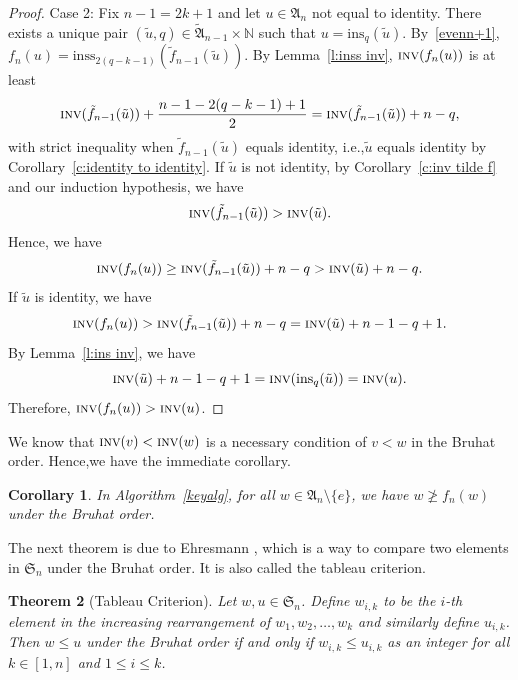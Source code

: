 \documentclass[12pt]{amsart}
\newtheorem{thm}{Theorem}[section]
\newtheorem{cor}[thm]{Corollary}
\theoremstyle{definition}
\numberwithin{equation}{section}
\newcommand{\sn}{\mathfrak{S}_n}
\newcommand{\inv}{\textsc{inv}}
\newcommand{\ins}[1]{\mathrm{ins}_{#1}}
\newcommand{\inss}[1]{\mathrm{inss}_{#1}}
\begin{document}
\begin{proof}
    Case 2: Fix $n-1 = 2k+1$ and let $u \in \mathfrak A_n$ not equal to identity. There exists a unique pair $(\tilde{u},q) \in \tilde{\mathfrak A}_{n-1} \times \mathbb N$ such that $u = \ins q (\tilde{u})$. By~\eqref{evenn+1}, $f_n(u) = \inss{2(q-k-1)}(\tilde{f}_{n-1}(\tilde{u}))$. By Lemma~\ref{l:inss inv}, $\inv (f_n(u))$ is at least
    \begin{equation*}
        \inv (\tilde{f}_{n-1}(\tilde{u}))+ \frac{n-1 - 2(q-k-1) +1}{2} = \inv (\tilde{f}_{n-1}(\tilde{u})) +n-q,
    \end{equation*}with strict inequality when $\tilde{f}_{n-1}(\tilde{u})$ equals identity, i.e.,$\tilde{u}$ equals identity by Corollary~\ref{c:identity to identity}. If $\tilde{u}$ is not identity, by Corollary~\ref{c:inv tilde f} and our induction hypothesis, we have
    \begin{equation*}
        \inv (\tilde{f}_{n-1} (\tilde{u})) > \inv (\tilde{u}).
    \end{equation*}Hence, we have \begin{equation*}
        \inv (f_n(u)) \geq \inv (\tilde{f}_{n-1}(\tilde{u})) +n-q > \inv (\tilde{u}) +n-q.
    \end{equation*}
    If $\tilde{u}$ is identity, we have
    \begin{equation*}
        \inv (f_n(u)) > \inv (\tilde{f}_{n-1}(\tilde{u})) +n-q = \inv (\tilde{u}) +n-1-q+1.
    \end{equation*}
    By Lemma~\ref{l:ins inv}, we have \begin{equation*}
         \inv (\tilde{u}) +n-1-q+1 = \inv (\ins q (\tilde{u})) = \inv (u).
    \end{equation*}Therefore, $\inv (f_n(u)) > \inv (u)$.
\end{proof}

We know that $\inv (v) < \inv (w)$ is a necessary condition of $v < w$ in the Bruhat order. Hence,we have the immediate corollary.

\begin{cor}
    In Algorithm~\ref{keyalg}, for all $w\in \mathfrak A_n \setminus\{e\}$, we have $w \ngeq f_n(w)$ under the Bruhat order.
\end{cor}

The next theorem is due to Ehresmann \cite{Ehresmann}, which is a way to compare two elements in $\sn$ under the Bruhat order. It is also called the tableau criterion.

\begin{thm}[Tableau Criterion]\label{TabCriterion}
    Let $w,u \in \sn$. Define $w_{i,k}$ to be the $i$-th element in the increasing rearrangement of $w_1,w_2,\dotsc, w_k$ and similarly define $u_{i,k}$. Then $w \leq u$ under the Bruhat order if and only if $w_{i,k} \leq u_{i,k}$ as an integer for all $k\in [1,n]$ and $1\leq i \leq k$.
\end{thm}
\end{document}
